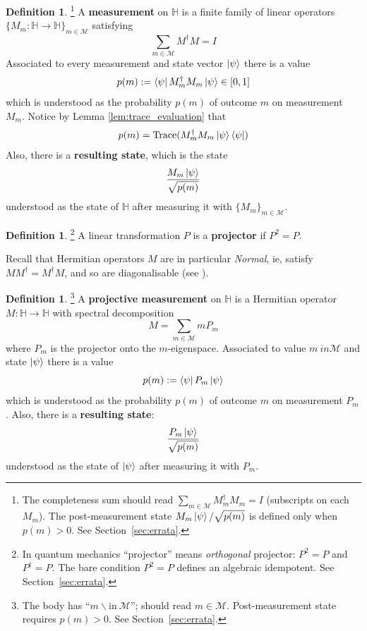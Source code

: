 \documentclass[12pt]{article}
\theoremstyle{plain}
\theoremstyle{definition}
\newtheorem{defn}[thm]{Definition} %
\newcommand{\bb}[1]{\mathbb{#1}}
\newcommand{\call}[1]{\mathcal{#1}}
\newcommand{\lto}{\longrightarrow}
\begin{document}
\begin{defn}\label{def:measurement}\footnote{The completeness sum should read $\sum_{m\in\mathcal{M}}M_m^\dagger M_m=I$ (subscripts on each $M_m$). The post-measurement state $M_m\ket{\psi}/\sqrt{p(m)}$ is defined only when $p(m)>0$. See Section~\ref{sec:errata}.}
A \textbf{measurement} on $\bb{H}$ is a finite family of linear operators $\lbrace M_m: \bb{H}\lto \bb{H}\rbrace_{m \in \call{M}}$ satisfying
\begin{equation}
\sum_{m \in \call{M}}M^{\dagger}M = I
\end{equation}
Associated to every measurement and state vector $\ket{\psi}$ there is a value
\begin{equation}
p(m) := \bra{\psi}M^{\dagger}_mM_m\ket{\psi} \in [0,1]
\end{equation}
which is understood as the probability $p(m)$ of outcome $m$ on measurement $M_m$. Notice by Lemma \ref{lem:trace_evaluation} that
\begin{equation}
p(m) = \operatorname{Trace}(M_m^\dagger M_m \ket{\psi}\bra{\psi})
\end{equation}
Also, there is a \textbf{resulting state}, which is the state
\begin{equation}
\frac{M_m\ket{\psi}}{\sqrt{p(m)}}
\end{equation}
understood as the state of $\bb{H}$ after measuring it with $\lbrace M_m\rbrace_{m \in \call{M}}$.
\end{defn}
\begin{defn}\footnote{In quantum mechanics ``projector'' means \emph{orthogonal} projector: $P^2=P$ and $P^\dagger=P$. The bare condition $P^2=P$ defines an algebraic idempotent. See Section~\ref{sec:errata}.}
A linear transformation $P$ is a \textbf{projector} if $P^2 = P$.
\end{defn}
Recall that Hermitian operators $M$ are in particular \emph{Normal}, ie, satisfy $MM^\dagger = M^\dagger M$, and so are diagonalisable (see \cite{analysis}).
\begin{defn}\footnote{The body has ``$m \backslash\text{in}\ \mathcal{M}$''; should read $m\in\mathcal{M}$. Post-measurement state requires $p(m)>0$. See Section~\ref{sec:errata}.}
A \textbf{projective measurement} on $\bb{H}$ is a Hermitian operator $M: \bb{H} \lto \bb{H}$ with spectral decomposition
\begin{equation}
M = \sum_{m \in \call{M}}m P_m
\end{equation}
where $P_m$ is the projector onto the $m$-eigenspace. Associated to value $m \ in \call{M}$ and state $\ket{\psi}$ there is a value
\begin{equation}
p(m) := \bra{\psi} P_m\ket{\psi}
\end{equation}
which is understood as the probability $p(m)$ of outcome $m$ on measurement $P_m$. Also, there is a \textbf{resulting state}:
\begin{equation}
\frac{P_m\ket{\psi}}{\sqrt{p(m)}}
\end{equation}
understood as the state of $\ket{\psi}$ after measuring it with $P_m$.
\end{defn}
\end{document}

